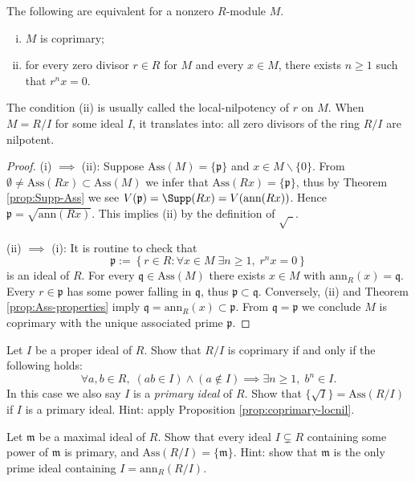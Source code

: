 \begin{proposition}\label{prop:coprimary-locnil}
	The following are equivalent for a nonzero $R$-module $M$.
	\begin{enumerate}[(i)]
		\item $M$ is coprimary;
		\item for every zero divisor $r \in R$ for $M$ and every $x \in M$, there exists $n \geq 1$ such that $r^n x = 0$.
	\end{enumerate}
\end{proposition}
The condition (ii) is usually called the local-nilpotency of $r$ on $M$. When $M = R/I$ for some ideal $I$, it translates into: all zero divisors of the ring $R/I$ are nilpotent.
\begin{proof}
	(i) $\implies$ (ii): Suppose $\text{Ass}(M) = \{ \mathfrak{p}\}$ and $x \in M \smallsetminus \{0\}$. From $\emptyset \neq \text{Ass}(Rx) \subset \text{Ass}(M)$ we infer that $\text{Ass}(Rx) = \{\mathfrak{p}\}$, thus by Theorem \ref{prop:Supp-Ass} we see $V(\mathfrak{p}) = \Supp(Rx) = V(\text{ann}(Rx))$. Hence $\mathfrak{p} = \sqrt{\text{ann}(Rx)}$. This implies (ii) by the definition of $\sqrt{\hspace{5pt}}$.
	
	(ii) $\implies$ (i): It is routine to check that
	\[ \mathfrak{p} := \left\{ r \in R: \forall x \in M \; \exists n \geq 1, \; r^n x = 0 \right\} \]
	is an ideal of $R$. For every $\mathfrak{q} \in \text{Ass}(M)$ there exists $x \in M$ with $\text{ann}_R(x) = \mathfrak{q}$. Every $r \in \mathfrak{p}$ has some power falling in $\mathfrak{q}$, thus $\mathfrak{p} \subset \mathfrak{q}$. Conversely, (ii) and Theorem \ref{prop:Ass-properties} imply $\mathfrak{q} = \text{ann}_R(x) \subset \mathfrak{p}$. From $\mathfrak{q}=\mathfrak{p}$ we conclude $M$ is coprimary with the unique associated prime $\mathfrak{p}$.
\end{proof}

\begin{exercise}\label{ex:primary-ideal}
	Let $I$ be a proper ideal of $R$. Show that $R/I$ is coprimary if and only if the following holds:
	\[ \forall a,b \in R, \; (ab \in I) \wedge (a \notin I) \implies \exists n \geq 1, \; b^n \in I. \]
	In this case we also say $I$ is a \emph{primary ideal} of $R$. Show that $\{\sqrt{I}\} = \text{Ass}(R/I)$ if $I$ is a primary ideal. Hint: apply Proposition \ref{prop:coprimary-locnil}.
\end{exercise}

\begin{exercise}\label{ex:maximal-primary}
	Let $\mathfrak{m}$ be a maximal ideal of $R$. Show that every ideal $I \subsetneq R$ containing some power of $\mathfrak{m}$ is primary, and $\text{Ass}(R/I) = \{\mathfrak{m}\}$. Hint: show that $\mathfrak{m}$ is the only prime ideal containing $I = \text{ann}_R(R/I)$.
\end{exercise}

